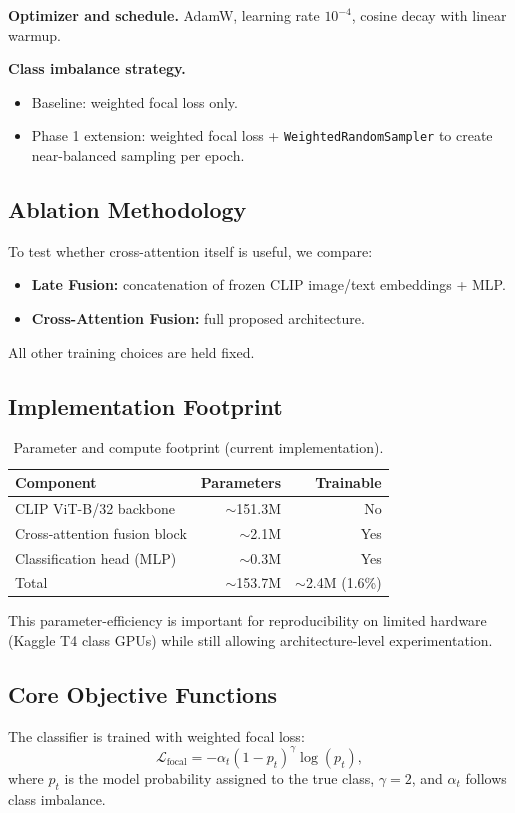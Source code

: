 \documentclass[11pt]{article}
\begin{document}
\textbf{Optimizer and schedule.} AdamW, learning rate \(10^{-4}\), cosine decay with linear warmup.

\textbf{Class imbalance strategy.}
\begin{itemize}[leftmargin=*,nosep]
  \item Baseline: weighted focal loss only.
  \item Phase 1 extension: weighted focal loss + \texttt{WeightedRandomSampler} to create near-balanced sampling per epoch.
\end{itemize}

\subsection{Ablation Methodology}
To test whether cross-attention itself is useful, we compare:
\begin{itemize}[leftmargin=*,nosep]
  \item \textbf{Late Fusion:} concatenation of frozen CLIP image/text embeddings + MLP.
  \item \textbf{Cross-Attention Fusion:} full proposed architecture.
\end{itemize}
All other training choices are held fixed.

\subsection{Implementation Footprint}
\begin{table}[h]
\centering
\small
\caption{Parameter and compute footprint (current implementation).}
\begin{tabular}{lrr}
\toprule
Component & Parameters & Trainable \\
\midrule
CLIP ViT-B/32 backbone & \(\sim\)151.3M & No \\
Cross-attention fusion block & \(\sim\)2.1M & Yes \\
Classification head (MLP) & \(\sim\)0.3M & Yes \\
\midrule
Total & \(\sim\)153.7M & \(\sim\)2.4M (1.6\%) \\
\bottomrule
\end{tabular}
\label{tab:params}
\end{table}

This parameter-efficiency is important for reproducibility on limited hardware (Kaggle T4 class GPUs) while still allowing architecture-level experimentation.

\subsection{Core Objective Functions}
The classifier is trained with weighted focal loss:
\[
\mathcal{L}_{\text{focal}} = -\alpha_t (1-p_t)^{\gamma}\log(p_t),
\]
where \(p_t\) is the model probability assigned to the true class, \(\gamma=2\), and \(\alpha_t\) follows class imbalance.
\end{document}

